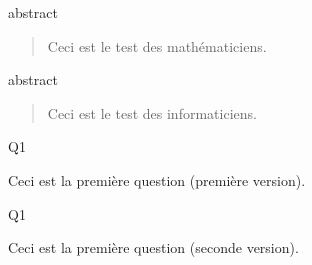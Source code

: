 \documentclass[12pt,a4paper, no-auto-maketitle%
]{tests}
\begin{document}
\begin{namequestion}{abstract}
  \begin{abstract}
    Ceci est le test des mathématiciens.
  \end{abstract}
\end{namequestion}
\begin{namequestion}{abstract}
  \begin{abstract}
    Ceci est le test des informaticiens.
  \end{abstract}
\end{namequestion}

\begin{namequestion}{Q1}
  \begin{question}
    Ceci est la première question (première version).
  \end{question}
\end{namequestion}
\begin{namequestion}{Q1}
  \begin{question}
    Ceci est la première question (seconde version).
  \end{question}
\end{namequestion}


\end{document}
